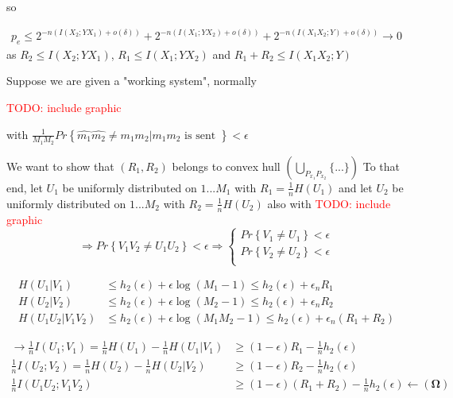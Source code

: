 \documentclass[twoside]{article}
\theoremstyle{definition} %
\newcommand{\todo}[1]{\textcolor{red}{TODO: #1}}
\renewcommand{\Pr}[1]{Pr\left\{#1\right\}}
\begin{document}
so

\begin{align*}
  p_e \leq 2^{-n(I(X_2;YX_1) + o(\delta))} + 2^{-n(I(X_1;YX_2) + o(\delta))} + 2^{-n(I(X_1X_2;Y) + o(\delta))} \to 0
\end{align*}
as $R_2\leq I(X_2;YX_1)$, $R_1\leq I(X_1;YX_2)$ and $R_1 + R_2\leq I(X_1X_2;Y)$



Suppose we are given a "working system", normally

\todo{include graphic}

with $\frac{1}{M_1 M_2} \Pr{\hat{m_1}\hat{m_2} \neq m_1 m_2 | m_1 m_2 \text{ is sent }} < \epsilon$

We want to show that $(R_1, R_2)$ belongs to convex hull $(\bigcup_{P_{x_1} P_{x_2}} \{...\})$
To that end, let $U_1$ be uniformly distributed on ${1 ... M_1}$ with $R_1 = \frac{1}{n} H(U_1)$ and let $U_2$ be uniformly distributed on ${1 ... M_2}$ with $R_2 = \frac{1}{n} H(U_2)$
also with \todo{include graphic}
\[
  \Rightarrow \Pr{V_1 V_2 \neq U_1 U_2} < \epsilon \Rightarrow
  \left\{
  \begin{array}{c}
    \Pr{V_1 \neq U_1} < \epsilon \\
    \Pr{V_2 \neq U_2} < \epsilon \\
  \end{array}
  \right.
\]


\begin{align*}
  H(U_1 | V_1) &\leq h_2(\epsilon) + \epsilon \log(M_1 - 1) \leq h_2(\epsilon) + \epsilon_n R_1 \\
  H(U_2 | V_2) &\leq h_2(\epsilon) + \epsilon \log(M_2 - 1) \leq h_2(\epsilon) + \epsilon_n R_2 \\
  H(U_1 U_2 | V_1 V_2) &\leq h_2(\epsilon) + \epsilon \log(M_1 M_2 - 1) \leq h_2(\epsilon) + \epsilon_n (R_1 + R_2)
\end{align*}

\begin{align*}
  \rightarrow \frac{1}{n} I(U_1; V_1) = \frac{1}{n} H(U_1) - \frac{1}{n} H(U_1 | V_1) &\geq (1 - \epsilon) R_1 - \frac{1}{n} h_2(\epsilon)\\
  \frac{1}{n} I(U_2; V_2) = \frac{1}{n} H(U_2) - \frac{1}{n} H(U_2 | V_2) &\geq (1 - \epsilon) R_2 - \frac{1}{n} h_2(\epsilon) \\
  \frac{1}{n} I(U_1 U_2; V_1 V_2) &\geq (1 - \epsilon) (R_1 + R_2) - \frac{1}{n} h_2(\epsilon) \leftarrow \mathbf{(\Omega)}
\end{align*}
\end{document}
